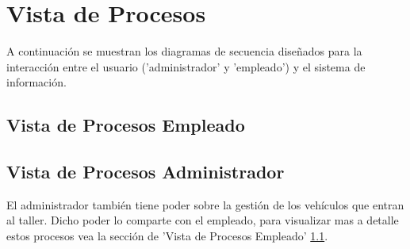 \section{Vista de Procesos}
A continuación se muestran los diagramas de secuencia diseñados para la interacción entre el usuario ('administrador' y 'empleado') y el sistema de información. 

\subsection{Vista de Procesos Empleado} \label{subsec: Vista Procesos Empleado}









\subsection{Vista de Procesos Administrador}
El administrador también tiene poder sobre la gestión de los vehículos que entran al taller. Dicho poder lo comparte con el empleado, para visualizar mas a detalle estos procesos vea la sección de 'Vista de Procesos Empleado' \ref{subsec: Vista Procesos Empleado}.












